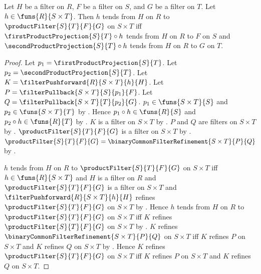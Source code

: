 \begin{theorem}\label{filter_tendsto_product_iff}
    Let $H$ be a filter on $R$, $F$ be a filter on $S$, and
        $G$ be a filter on $T$.
    Let $h\in\funs{R}{S\times T}$.
    Then $h$ tends from $H$ on $R$ to $\productFilter{S}{T}{F}{G}$ on
        $S\times T$ iff
        $\firstProductProjection{S}{T}\circ h$ tends from $H$ on $R$ to
            $F$ on $S$ and
        $\secondProductProjection{S}{T}\circ h$ tends from $H$ on $R$ to
            $G$ on $T$.
\end{theorem}
\begin{proof}
    Let $p_1=\firstProductProjection{S}{T}$.
    Let $p_2=\secondProductProjection{S}{T}$.
    Let $K=\filterPushforward{R}{S\times T}{h}{H}$.
    Let $P=\filterPullback{S\times T}{S}{p_1}{F}$.
    Let $Q=\filterPullback{S\times T}{T}{p_2}{G}$.
    $p_1\in\funs{S\times T}{S}$ and $p_2\in\funs{S\times T}{T}$ by
        .
    Hence $p_1\circ h\in\funs{R}{S}$ and
        $p_2\circ h\in\funs{R}{T}$ by .
    $K$ is a filter on $S\times T$ by
        .
    $P$ and $Q$ are filters on $S\times T$ by
        .
    $\productFilter{S}{T}{F}{G}$ is a filter on $S\times T$ by
        .
    $\productFilter{S}{T}{F}{G}
        =\binaryCommonFilterRefinement{S\times T}{P}{Q}$ by
        .

    $h$ tends from $H$ on $R$ to $\productFilter{S}{T}{F}{G}$ on
        $S\times T$ iff
        $h\in\funs{R}{S\times T}$ and $H$ is a filter on $R$ and
        $\productFilter{S}{T}{F}{G}$ is a filter on $S\times T$ and
        $\filterPushforward{R}{S\times T}{h}{H}$ refines
            $\productFilter{S}{T}{F}{G}$ on $S\times T$ by
        .
    Hence $h$ tends from $H$ on $R$ to $\productFilter{S}{T}{F}{G}$ on
        $S\times T$ iff
        $K$ refines $\productFilter{S}{T}{F}{G}$ on $S\times T$ by
        \auto.
    $K$ refines $\binaryCommonFilterRefinement{S\times T}{P}{Q}$ on
        $S\times T$ iff
        $K$ refines $P$ on $S\times T$ and
        $K$ refines $Q$ on $S\times T$ by
        .
    Hence $K$ refines $\productFilter{S}{T}{F}{G}$ on $S\times T$ iff
        $K$ refines $P$ on $S\times T$ and
        $K$ refines $Q$ on $S\times T$.


\end{proof}
